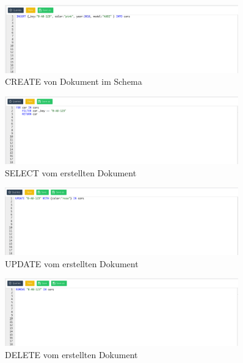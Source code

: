 \begin{figure}[htbp] 
  	\centering
     \includegraphics[width=0.9\textwidth]{./images/create.png}
 	\caption{CREATE von Dokument im Schema}
  \label{fig:DataSchema}
\end{figure}
\begin{figure}[htbp] 
  	\centering
     \includegraphics[width=0.9\textwidth]{./images/select.png}
 	\caption{SELECT vom erstellten Dokument}
  \label{fig:DataSchema}
\end{figure}
\begin{figure}[htbp] 
  	\centering
     \includegraphics[width=0.9\textwidth]{./images/update.png}
 	\caption{UPDATE vom erstellten Dokument}
  \label{fig:DataSchema}
\end{figure}
\begin{figure}[htbp] 
  	\centering
     \includegraphics[width=0.9\textwidth]{./images/delete.png}
 	\caption{DELETE vom erstellten Dokument}
  \label{fig:DataSchema}
\end{figure}